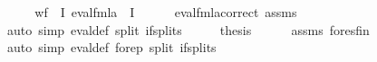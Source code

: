 \begin{isabellebody}
\ {\isacharminus}{\kern0pt}\isanewline
\ \ \isamarkupfalse%
\ {\isachardoublequoteopen}wf\ {\isasymphi}\ I\ {\isacharparenleft}{\kern0pt}eval{\isacharunderscore}{\kern0pt}fmla\ {\isasymphi}\ I{\isacharparenright}{\kern0pt}{\isachardoublequoteclose}\isanewline
\ \ \ \ \isamarkupfalse%
\ eval{\isacharunderscore}{\kern0pt}fmla{\isacharunderscore}{\kern0pt}correct\ assms\isanewline
\ \ \ \ \isamarkupfalse%
\ {\isacharparenleft}{\kern0pt}auto\ simp{\isacharcolon}{\kern0pt}\ eval{\isacharunderscore}{\kern0pt}def\ split{\isacharcolon}{\kern0pt}\ if{\isacharunderscore}{\kern0pt}splits{\isacharparenright}{\kern0pt}\isanewline
\ \ \isamarkupfalse%
\ \isamarkupfalse%
\ {\isacharquery}{\kern0pt}thesis\isanewline
\ \ \ \ \isamarkupfalse%
\ assms\ fo{\isacharunderscore}{\kern0pt}res{\isacharunderscore}{\kern0pt}fin\isanewline
\ \ \ \ \isamarkupfalse%
\ {\isacharparenleft}{\kern0pt}auto\ simp{\isacharcolon}{\kern0pt}\ eval{\isacharunderscore}{\kern0pt}def\ fo{\isacharunderscore}{\kern0pt}rep\ split{\isacharcolon}{\kern0pt}\ if{\isacharunderscore}{\kern0pt}splits{\isacharparenright}{\kern0pt}\isanewline
{}\isamarkupfalse%
%
\endisatagproof
{\isafoldproof}%
%
\isadelimproof
\isanewline
%
\endisadelimproof
\isanewline
{}\isamarkupfalse%
\isanewline
%
\isadelimtheory
\isanewline
%
\endisadelimtheory
%
\isatagtheory
{}\isamarkupfalse%
%
\endisatagtheory
{\isafoldtheory}%
%
\isadelimtheory
%
\endisadelimtheory
%
\end{isabellebody}%
\endinput
